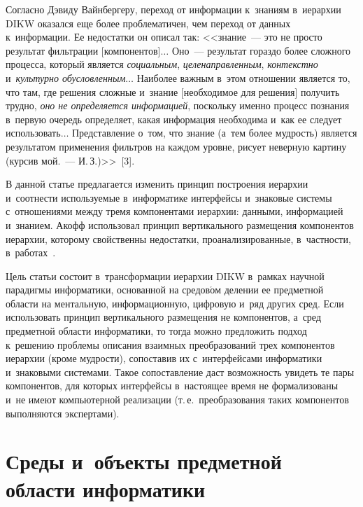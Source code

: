 \begin{multicols}{2}
  Согласно Дэвиду Вайнбергеру, переход от информации к~знаниям в~иерархии 
DIKW оказался еще более проб\-ле\-ма\-ти\-чен, чем переход от данных 
к~информации. Ее недостатки он описал так: <<знание~--- это не прос\-то 
результат фильт\-ра\-ции [компонентов]$\ldots$ Оно~--- результат гораздо более 
слож\-но\-го процесса, который является \textit{социальным}, 
\textit{це\-ле\-на\-прав\-лен\-ным}, \textit{контекстно} и~\textit{культурно 
обуслов\-лен\-ным}$\ldots$ Наиболее важ\-ным в~этом отношении является то, что 
там, где решения слож\-ные и~знание [необходимое для решения] получить 
труд\-но, \textit{оно не определяется информацией}, поскольку именно процесс 
по\-зна\-ния в~пер\-вую очередь определяет, какая информация необходима и~как ее 
следует использовать$\ldots$ Представление о~том, что знание (а~тем более 
муд\-рость) является результатом применения фильт\-ров на каж\-дом уров\-не, 
рисует не\-вер\-ную картину (курсив мой.~--- И.\,З.)>>~[3].
  
  В данной статье предлагается изменить принцип по\-стро\-ения иерархии 
и~соотнести используемые в~информатике интерфейсы и~знаковые сис\-те\-мы 
с~отношениями между тремя компонентами иерархии: данными, информацией и~знанием. 
Акофф использовал принцип вертикального размещения 
компонентов иерархии, которому свойственны недостатки, 
проанализированные, в~част\-ности, в~работах~\cite{1-zatsm, 3-zatsm}. 
  
  Цель статьи состоит в~трансформации иерархии DIKW в~рамках научной 
парадигмы информатики, основанной на средов$\acute{\mbox{о}}$м делении 
ее предметной об\-ласти на ментальную, информационную, циф\-ро\-вую и~ряд 
других сред. Если использовать принцип вертикального размещения не 
компонентов, а~сред предметной об\-ласти информатики, то тогда мож\-но 
пред\-ло\-жить подход к~решению проб\-ле\-мы описания взаимных 
преобразований трех компонентов иерархии (кроме муд\-рости), со\-по\-ста\-вив их 
с~интерфейсами информатики и~знаковыми сис\-те\-ма\-ми. Такое 
со\-по\-став\-ле\-ние даст воз\-мож\-ность увидеть те пары компонентов, для которых 
интерфейсы в~на\-сто\-ящее время не формализованы и~не имеют компьютерной 
реализации (т.\,е.\ преобразования таких компонентов выполняются 
экс\-пер\-та\-ми).

\vspace*{-3pt}
  
\section{Среды и~объекты предметной области информатики}


\end{multicols}
